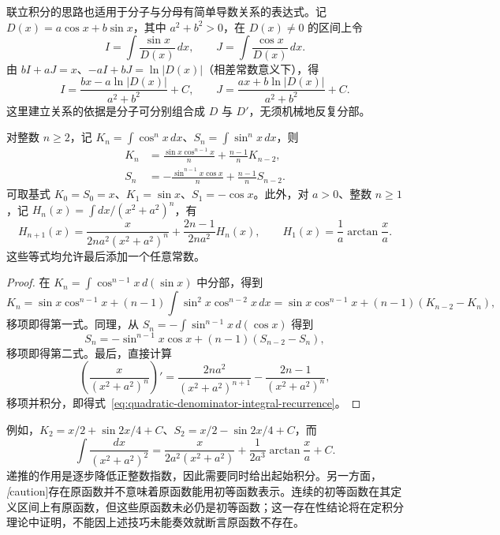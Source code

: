 \documentclass[UTF8,12pt,a4paper,fontset=fandol]{ctexbook}
\begin{document}
联立积分的思路也适用于分子与分母有简单导数关系的表达式。记 $D(x)=a\cos x+b\sin x$，其中 $a^2+b^2>0$，在 $D(x)\neq0$ 的区间上令
\[
    I=\int\frac{\sin x}{D(x)}\,dx,\qquad
    J=\int\frac{\cos x}{D(x)}\,dx.
\]
由 $bI+aJ=x$、$-aI+bJ=\ln|D(x)|$（相差常数意义下），得
\[
    I=\frac{bx-a\ln|D(x)|}{a^2+b^2}+C,
    \qquad J=\frac{ax+b\ln|D(x)|}{a^2+b^2}+C.
\]
这里建立关系的依据是分子可分别组合成 $D$ 与 $D'$，无须机械地反复分部。

\begin{proposition}[常用积分递推公式]
\label{prop:power-integral-recurrences}
对整数 $n\geq2$，记 $K_n=\int\cos^n x\,dx$、$S_n=\int\sin^n x\,dx$，则
\begin{align}
    K_n&=\frac{\sin x\cos^{n-1}x}{n}+\frac{n-1}{n}K_{n-2},
       \label{eq:cosine-power-integral-recurrence}\\
    S_n&=-\frac{\sin^{n-1}x\cos x}{n}+\frac{n-1}{n}S_{n-2}.
       \label{eq:sine-power-integral-recurrence}
\end{align}
可取基式 $K_0=S_0=x$、$K_1=\sin x$、$S_1=-\cos x$。此外，对 $a>0$、整数 $n\geq1$，记 $H_n(x)=\int dx/(x^2+a^2)^n$，有
\begin{equation}
    H_{n+1}(x)=\frac{x}{2na^2(x^2+a^2)^n}
          +\frac{2n-1}{2na^2}H_n(x),
    \qquad H_1(x)=\frac1a\arctan\frac xa.
    \label{eq:quadratic-denominator-integral-recurrence}
\end{equation}
这些等式均允许最后添加一个任意常数。
\end{proposition}

\begin{proof}
在 $K_n=\int\cos^{n-1}x\,d(\sin x)$ 中分部，得到
\[
    K_n=\sin x\cos^{n-1}x
          +(n-1)\int\sin^2x\cos^{n-2}x\,dx
       =\sin x\cos^{n-1}x+(n-1)(K_{n-2}-K_n),
\]
移项即得第一式。同理，从 $S_n=-\int\sin^{n-1}x\,d(\cos x)$ 得到
\[
    S_n=-\sin^{n-1}x\cos x+(n-1)(S_{n-2}-S_n),
\]
移项即得第二式。最后，直接计算
\[
    \left(\frac{x}{(x^2+a^2)^n}\right)'
       =\frac{2na^2}{(x^2+a^2)^{n+1}}
           -\frac{2n-1}{(x^2+a^2)^n},
\]
移项并积分，即得式~\eqref{eq:quadratic-denominator-integral-recurrence}。
\end{proof}

例如，$K_2=x/2+\sin2x/4+C$、$S_2=x/2-\sin2x/4+C$，而
\[
    \int\frac{dx}{(x^2+a^2)^2}
       =\frac{x}{2a^2(x^2+a^2)}+\frac1{2a^3}\arctan\frac xa+C.
\]
递推的作用是逐步降低正整数指数，因此需要同时给出起始积分。另一方面，\emph[caution]{存在原函数并不意味着原函数能用初等函数表示。}连续的初等函数在其定义区间上有原函数，但这些原函数未必仍是初等函数；这一存在性结论将在定积分理论中证明，不能因上述技巧未能奏效就断言原函数不存在。
\end{document}
